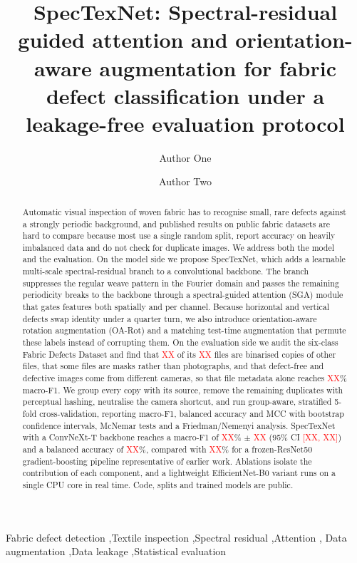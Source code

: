 \documentclass[preprint,12pt,authoryear]{elsarticle}
\providecommand{\PropMacroFone}{\textcolor{red}{XX}}
\providecommand{\PropMacroFoneStd}{\textcolor{red}{XX}}
\providecommand{\PropMacroFoneCI}{\textcolor{red}{[XX, XX]}}
\providecommand{\PropBAcc}{\textcolor{red}{XX}}
\providecommand{\VoneMacroFone}{\textcolor{red}{XX}}
\providecommand{\NRaw}{\textcolor{red}{XX}}
\providecommand{\NDerived}{\textcolor{red}{XX}}
\providecommand{\ShortcutMetaFone}{\textcolor{red}{XX}}
\begin{document}
\begin{frontmatter}

\title{SpecTexNet: Spectral-residual guided attention and orientation-aware augmentation for fabric defect classification under a leakage-free evaluation protocol}

\author[bracu]{Author One}
\author[bracu]{Author Two}

\begin{abstract}
Automatic visual inspection of woven fabric has to recognise small, rare defects against a
strongly periodic background, and published results on public fabric datasets are hard to compare
because most use a single random split, report accuracy on heavily imbalanced data and do not check
for duplicate images. We address both the model and the evaluation. On the model side we propose
SpecTexNet, which adds a learnable multi-scale spectral-residual branch to a convolutional backbone.
The branch suppresses the regular weave pattern in the Fourier domain and passes the remaining
periodicity breaks to the backbone through a spectral-guided attention (SGA) module that gates
features both spatially and per channel. Because horizontal and vertical defects swap identity
under a quarter turn, we also introduce orientation-aware rotation augmentation (OA-Rot) and a
matching test-time augmentation that permute these labels instead of corrupting them. On the
evaluation side we audit the six-class Fabric Defects Dataset and find that \NDerived{} of its
\NRaw{} files are binarised copies of other files, that some files are masks rather than photographs,
and that defect-free and defective images come from different cameras, so that file metadata alone
reaches \ShortcutMetaFone\% macro-F1. We group every copy with its source, remove the remaining
duplicates with perceptual hashing, neutralise the camera shortcut, and run group-aware, stratified
5-fold cross-validation, reporting macro-F1, balanced accuracy and MCC with bootstrap
confidence intervals, McNemar tests and a Friedman/Nemenyi analysis. SpecTexNet with a ConvNeXt-T
backbone reaches a macro-F1 of \PropMacroFone{}\% $\pm$ \PropMacroFoneStd{} (95\% CI
\PropMacroFoneCI{}) and a balanced accuracy of \PropBAcc{}\%, compared with \VoneMacroFone{}\% for a
frozen-ResNet50 gradient-boosting pipeline representative of earlier work. Ablations isolate the
contribution of each component, and a lightweight EfficientNet-B0 variant runs on a single CPU
core in real time. Code, splits and trained models are public.
\end{abstract}

\begin{keyword}
Fabric defect detection \sep Textile inspection \sep Spectral residual \sep Attention \sep
Data augmentation \sep Data leakage \sep Statistical evaluation
\end{keyword}
\end{frontmatter}
\end{document}
